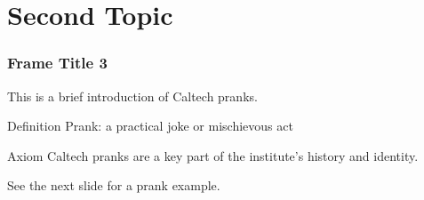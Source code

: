 \section{Second Topic}

\begin{frame}
\frametitle{Frame Title 3}

This is a brief introduction of \alert{Caltech pranks}.

\begin{block}{Definition}
Prank: a practical joke or mischievous act
\end{block}

\begin{alertblock}{Axiom}
Caltech pranks are a key part of the institute's history and identity.
\end{alertblock}

\begin{exampleblock}
See the next slide for a prank example.
\end{exampleblock}
\end{frame}